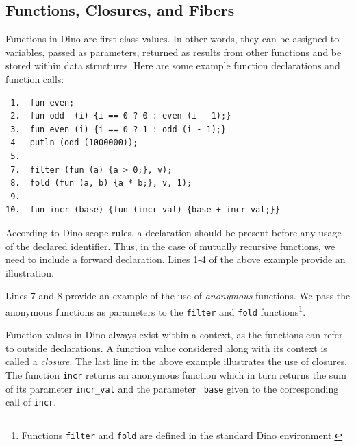 \documentclass[preprint]{sigplanconf}
\begin{document}
\subsection{Functions, Closures, and Fibers}

  Functions in Dino are first class values.  In other words, they
can be assigned to variables, passed as parameters, returned as
results from other functions and be stored within data structures.  Here
are some example function declarations and function calls:

{\footnotesize
\begin{verbatim}
 1.  fun even;
 2.  fun odd  (i) {i == 0 ? 0 : even (i - 1);}
 3.  fun even (i) {i == 0 ? 1 : odd (i - 1);}
 4   putln (odd (1000000));
 5.
 7.  filter (fun (a) {a > 0;}, v);
 8.  fold (fun (a, b) {a * b;}, v, 1);
 9.
10.  fun incr (base) {fun (incr_val) {base + incr_val;}}
\end{verbatim}
}

According to Dino scope rules, a declaration should be present before any usage of the
declared identifier. Thus, in the case of mutually recursive functions, we need to include
a forward declaration. Lines 1-4 of the above example provide an illustration.

Lines 7 and 8 provide an example of the use of \emph{anonymous} functions.  We pass
the anonymous functions as parameters to the {\tt filter}
and {\tt fold} functions\footnote{Functions {\tt filter} and {\tt fold} are defined in the standard
Dino environment.}.

Function values in Dino always exist within a context, as the
functions can refer to outside declarations. A function value considered along with its
context is called a \emph{closure}. The last line in the above example
illustrates the use of closures.  The function {\tt incr} returns an anonymous
function which in turn returns the sum of its parameter {\tt incr\_val} and the parameter {\tt
base} given to the corresponding call of {\tt incr}.
\end{document}
